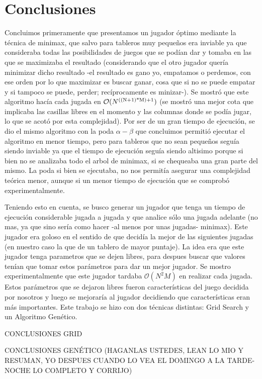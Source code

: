 \documentclass[A4paper,oneside,fleqn,11pt]{article}
\theoremstyle{definition}
\begin{document}
\section{Conclusiones}

Concluimos primeramente que presentamos un jugador óptimo mediante la técnica de minimax, que salvo para tableros muy pequeños era inviable ya que consideraba todas las posibilidades de juegos que se podían dar y tomaba en las que se maximizaba el resultado (considerando que el otro jugador quería minimizar dicho resultado -el resultado es gano yo, empatamos o perdemos, con ese orden por lo que maximizar es buscar ganar, cosa que si no se puede empatar y si tampoco se puede, perder; recíprocamente es minizar-). Se mostró que este algoritmo hacía cada jugada en $\mathcal{O}(N\textsuperscript{((N+1)*M)+1})$ (se mostró una mejor cota que implicaba las casillas libres en el momento y las columnas donde se podía jugar, lo que se acotó por esta complejidad). Por ser de un gran tiempo de ejecución, se dio el mismo algoritmo con la poda $\alpha - \beta$ que concluimos permitió ejecutar el algoritmo en menor tiempo, pero para tableros que no sean pequeños seguía siendo inviable ya que el tiempo de ejecución seguía siendo altisimo porque si bien no se analizaba todo el arbol de minimax, si se chequeaba una gran parte del mismo. La poda si bien se ejecutaba, no nos permitía asegurar una complejidad teórica menor, aunque si un menor tiempo de ejecución que se comprobó experimentalmente.

Teniendo esto en cuenta, se busco generar un jugador que tenga un tiempo de ejecución considerable jugada a jugada y que analice sólo una jugada adelante (no mas, ya que sino sería como hacer -al menos por unas jugadas- minimax). Este jugador era goloso en el sentido de que decidía la mejor de las siguientes jugadas (en nuestro caso la que de un tablero de mayor puntaje). La idea era que este jugador tenga parametros que se dejen libres, para despues buscar que valores tenían que tomar estos parámetros para dar un mejor jugador. Se mostro experimentalmente que este jugador tardaba $\mathcal{O}(N^2M)$ en realizar cada jugada. Estos parámetros que se dejaron libres fueron características del juego decidida por nosotros y luego se mejoraría al jugador decidiendo que características eran más importantes. Este trabajo se hizo con dos técnicas distintas: Grid Search y un Algoritmo Genético.

CONCLUSIONES GRID

CONCLUSIONES GENÉTICO (HAGANLAS USTEDES, LEAN LO MIO Y RESUMAN, YO DESPUES CUANDO LO VEA EL DOMINGO A LA TARDE-NOCHE LO COMPLETO Y CORRIJO)
\end{document}
